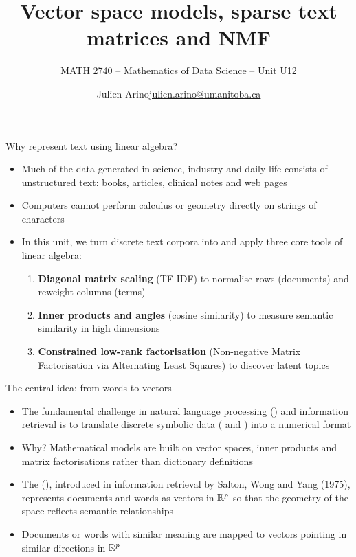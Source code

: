 \documentclass[aspectratio=169]{beamer}\usepackage[]{graphicx}\usepackage[]{xcolor}
\subtitle{MATH 2740 -- Mathematics of Data Science -- Unit U12}
\author{\texorpdfstring{Julien Arino\newline\url{julien.arino@umanitoba.ca}}{Julien Arino}}
\institute{Department of Mathematics @ University of Manitoba}
\title{Vector space models, sparse text matrices and NMF}
\begin{document}
\setcounter{theorem}{181}

\SStitlepage
\SSoutlinepage


\begin{frame}{Why represent text using linear algebra?}
\begin{itemize}
\item Much of the data generated in science, industry and daily life consists of unstructured text: books, articles, clinical notes and web pages
\vfill
\item Computers cannot perform calculus or geometry directly on strings of characters
\vfill
\item In this unit, we turn discrete text corpora into  and apply three core tools of linear algebra:
\begin{enumerate}
\item \textbf{Diagonal matrix scaling} (TF-IDF) to normalise rows (documents) and reweight columns (terms)
\item \textbf{Inner products and angles} (cosine similarity) to measure semantic similarity in high dimensions
\item \textbf{Constrained low-rank factorisation} (Non-negative Matrix Factorisation via Alternating Least Squares) to discover latent topics
\end{enumerate}
\end{itemize}
\end{frame}



\begin{frame}{The central idea: from words to vectors}
\begin{itemize}
\item The fundamental challenge in natural language processing () and information retrieval is to translate discrete symbolic data ( and ) into a numerical format
\vfill
\item Why? Mathematical models are built on vector spaces, inner products and matrix factorisations rather than dictionary definitions
\vfill
\item The  (), introduced in information retrieval by Salton, Wong and Yang (1975), represents documents and words as vectors in $\mathbb{R}^p$ so that the geometry of the space reflects semantic relationships
\vfill
\item Documents or words with similar meaning are mapped to vectors pointing in similar directions in $\mathbb{R}^p$
\end{itemize}
\end{frame}
\end{document}
